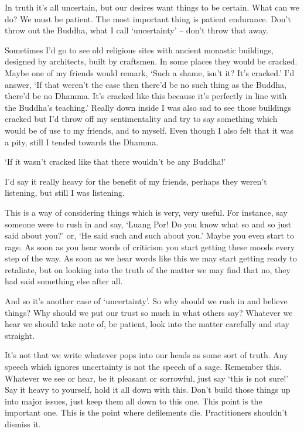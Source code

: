 In truth it's all uncertain, but our desires want things to be certain. What can we do? We must be patient. The most important thing is  patient endurance. Don't throw out the Buddha, what I call `uncertainty' -- don't throw that away. 

Sometimes I'd go to see old religious sites with ancient monastic buildings, designed by architects, built by craftsmen. In some places they would be cracked. Maybe one of my friends would remark, `Such a shame, isn't it? It's cracked.' I'd answer, `If that weren't the case then there'd be no such thing as the Buddha, there'd be no Dhamma. It's cracked like this because it's perfectly in line with the Buddha's teaching.' Really down inside I was also sad to see those buildings cracked but I'd throw off my sentimentality and try to say something which would be of use to my friends, and to myself. Even though I also felt that it was a pity, still I tended towards the Dhamma. 

`If it wasn't cracked like that there wouldn't be any Buddha!' 

I'd say it really heavy for the benefit of my friends, perhaps they weren't listening, but still I was listening. 

This is a way of considering things which is very, very useful. For instance, say someone were to rush in and say, `Luang Por! Do you know what so and so just said about you?' or, `He said such and such about you.' Maybe you even start to rage. As soon as you hear words of criticism you start getting these moods every step of the way. As soon as we hear words like this we may start getting ready to retaliate, but on looking into the truth of the matter we may find that no, they had said something else after all. 

And so it's another case of `uncertainty'. So why should we rush in and believe things? Why should we put our trust so much in what others say? Whatever we hear we should take note of, be patient, look into the matter carefully and stay straight. 

It's not that we write whatever pops into our heads as some sort of truth. Any speech which ignores uncertainty is not the speech of a sage. Remember this. Whatever we see or hear, be it pleasant or sorrowful, just say `this is not sure!' Say it heavy to yourself, hold it all down with this. Don't build those things up into major issues, just keep them all down to this one. This point is the important one. This is the point where defilements die. Practitioners shouldn't dismiss it. 

